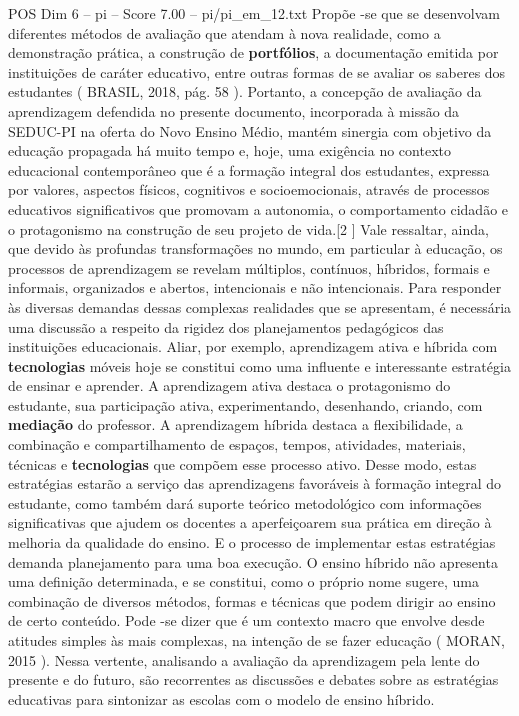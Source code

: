 \begin{textsample}{POS Dim 6 – pi – Score 7.00 – pi/pi\_em\_12.txt}
Propõe -se que se desenvolvam diferentes métodos de avaliação que atendam à nova realidade, como a demonstração prática, a construção de \textbf{portfólios}, a documentação emitida por instituições de caráter educativo, entre outras formas de se avaliar os saberes dos estudantes ( BRASIL, 2018, pág. 58 ).
Portanto, a concepção de avaliação da aprendizagem defendida no presente documento, incorporada à missão da SEDUC-PI na oferta do Novo Ensino Médio, mantém sinergia com objetivo da educação propagada há muito tempo e, hoje, uma exigência no contexto educacional contemporâneo que é a formação integral dos estudantes, expressa por valores, aspectos físicos, cognitivos e socioemocionais, através de processos educativos significativos que promovam a autonomia, o comportamento cidadão e o protagonismo na construção de seu projeto de vida.[2 ] Vale ressaltar, ainda, que devido às profundas transformações no mundo, em particular à educação, os processos de aprendizagem se revelam múltiplos, contínuos, híbridos, formais e informais, organizados e abertos, intencionais e não intencionais.
Para responder às diversas demandas dessas complexas realidades que se apresentam, é necessária uma discussão a respeito da rigidez dos planejamentos pedagógicos das instituições educacionais.
Aliar, por exemplo, aprendizagem ativa e híbrida com \textbf{tecnologias} móveis hoje se constitui como uma influente e interessante estratégia de ensinar e aprender.
A aprendizagem ativa destaca o protagonismo do estudante, sua participação ativa, experimentando, desenhando, criando, com \textbf{mediação} do professor.
A aprendizagem híbrida destaca a flexibilidade, a combinação e compartilhamento de espaços, tempos, atividades, materiais, técnicas e \textbf{tecnologias} que compõem esse processo ativo.
Desse modo, estas estratégias estarão a serviço das aprendizagens favoráveis à formação integral do estudante, como também dará suporte teórico metodológico com informações significativas que ajudem os docentes a aperfeiçoarem sua prática em direção à melhoria da qualidade do ensino.
E o processo de implementar estas estratégias demanda planejamento para uma boa execução.
O ensino híbrido não apresenta uma definição determinada, e se constitui, como o próprio nome sugere, uma combinação de diversos métodos, formas e técnicas que podem dirigir ao ensino de certo conteúdo.
Pode -se dizer que é um contexto macro que envolve desde atitudes simples às mais complexas, na intenção de se fazer educação ( MORAN, 2015 ).
Nessa vertente, analisando a avaliação da aprendizagem pela lente do presente e do futuro, são recorrentes as discussões e debates sobre as estratégias educativas para sintonizar as escolas com o modelo de ensino híbrido.

\end{textsample}
